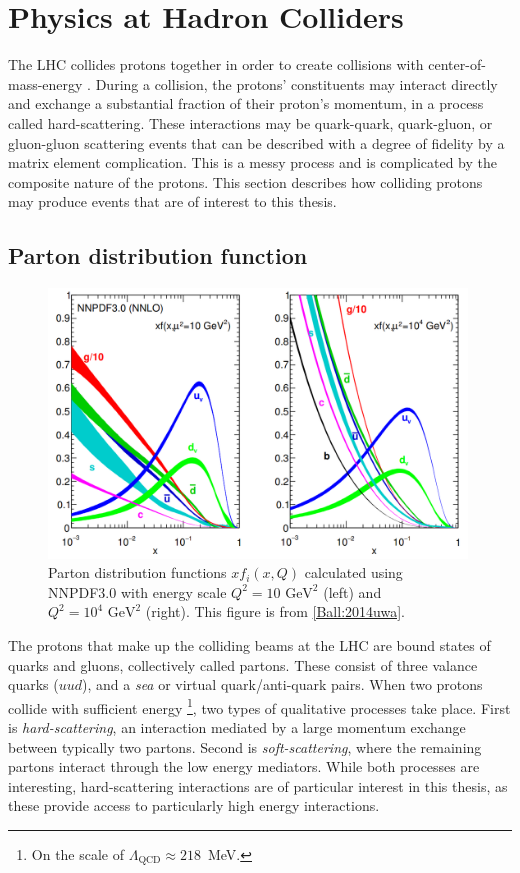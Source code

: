 \section{Physics at Hadron Colliders}

The LHC collides protons together in order to create collisions with center-of-mass-energy \sqrts.
During a collision, the protons' constituents may interact directly and exchange a substantial fraction of their proton's momentum, in a process called hard-scattering.
These interactions may be quark-quark, quark-gluon, or gluon-gluon scattering events that can be described with a degree of fidelity by a matrix element complication.
This is a messy process and is complicated by the composite nature of the protons.
This section describes how colliding protons may produce events that are of interest to this thesis.

\subsection{Parton distribution function}

\begin{figure}[h!]
\captionsetup[subfigure]{position=b}
\centering
\includegraphics[width=0.99\textwidth]{figures/pheno/pdgpdf.png}
\caption{Parton distribution functions $xf_i(x,Q)$ calculated using NNPDF3.0 with energy scale $Q^2=10\text{~GeV}^2$ (left) and $Q^2=10^4\text{~GeV}^2$ (right). This figure is from \ref{Ball:2014uwa}.}
\label{fig:partDistFunc}
\end{figure}

The protons that make up the colliding beams at the LHC are bound states of quarks and gluons, collectively called partons.
These consist of three valance quarks ($uud$), and a \emph{sea} or virtual quark/anti-quark pairs.
When two protons collide with sufficient energy \footnote{On the scale of $\Lambda_\text{QCD}\approx218$~MeV.}, two types of qualitative processes take place.
First is \emph{hard-scattering}, an interaction mediated by a large momentum exchange between typically two partons.
Second is \emph{soft-scattering}, where the remaining partons interact through the low energy mediators.
While both processes are interesting, hard-scattering interactions are of particular interest in this thesis, as these provide access to particularly high energy interactions.

